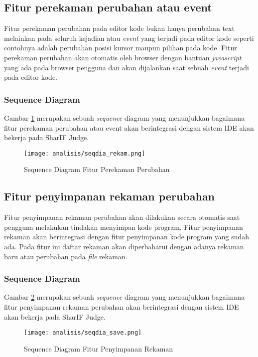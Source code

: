 
\subsection{Fitur perekaman perubahan atau event}
\label{sub:3:2:rekam}
Fitur perekaman perubahan pada editor kode bukan hanya perubahan text melainkan pada seluruh kejadian atau \textit{event} yang terjadi pada editor kode seperti contohnya adalah perubahan posisi kursor maupun pilihan pada kode. Fitur perekaman perubahan akan otomatis oleh browser dengan bantuan \textit{javascript} yang ada pada browser pengguna dan akan dijalankan saat sebuah \textit{event} terjadi pada editor kode.

\subsubsection{Sequence Diagram}
Gambar \ref{fig:3:2:seqdia_rekam} merupakan sebuah \textit{sequence} diagram yang menunjukkan bagaimana fitur perekaman perubahan atau event akan berintegrasi dengan sistem IDE akan bekerja pada SharIF Judge.
\begin{figure}[H]
	\centering
	\texttt{[image: analisis/seqdia\_rekam.png]}
	\caption{Sequence Diagram Fitur Perekaman Perubahan}
	\label{fig:3:2:seqdia_rekam}
\end{figure}

\subsection{Fitur penyimpanan rekaman perubahan}
\label{sub:3:2:save}
Fitur penyimpanan rekaman perubahan akan dilakukan secara otomatis saat pengguna melakukan tindakan menyimpan kode program. Fitur penyimpanan rekaman akan berintegrasi dengan fitur penyimpanan kode program yang sudah ada. Pada fitur ini daftar rekaman akan diperbaharui dengan adanya rekaman baru atau perubahan pada \textit{file} rekaman.

\subsubsection{Sequence Diagram}
Gambar \ref{fig:3:2:seqdia_save} merupakan sebuah \textit{sequence} diagram yang menunjukkan bagaimana fitur penyimpanan rekaman perubahan akan berintegrasi dengan sistem IDE akan bekerja pada SharIF Judge.
\begin{figure}[H]
	\centering
	\texttt{[image: analisis/seqdia\_save.png]}
	\caption{Sequence Diagram Fitur Penyimpanan Rekaman}
	\label{fig:3:2:seqdia_save}
\end{figure}

